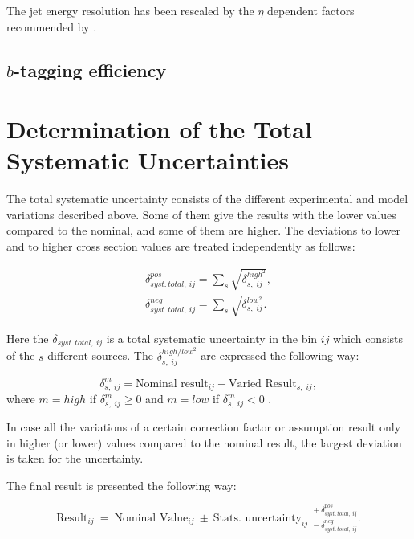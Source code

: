 The jet energy resolution has been rescaled by the $\eta$ dependent factors recommended by \cite{TWikiSystJER}.

\subsection{$b$-tagging efficiency}
\section{Determination of the Total Systematic Uncertainties}

The total systematic uncertainty consists of the different experimental and model variations described above.
Some of them give the results with the lower values compared to the nominal, and some of them are higher.
The deviations to lower and to higher cross section values are treated independently as follows:

\begin{align}
 \delta_{syst.\,total,\:ij}^{pos} = \sum_{s}\sqrt{\delta_{s,\;ij}^{high^{2}}}, \\
 \delta_{syst.\,total,\:ij}^{neg} = \sum_{s} \sqrt{\delta_{s,\;ij}^{low^{2}}}.
\end{align}

Here the $\delta_{syst.\,total,\:ij}$ is a total systematic uncertainty in the bin $ij$ which consists of the
$s$ different sources. The $\delta_{s,\;ij}^{high/low^{2}}$ are expressed the following way:

\begin{equation}
 \delta_{s,\;ij}^{m} = \textrm{Nominal result}_{ij} - \textrm{Varied Result}_{s,\;ij}, 
\end{equation}
where $m = high$ if $\delta_{s,\;ij}^{m} \geq 0$ and $m = low$ if $\delta_{s,\;ij}^{m} < 0$ . 

In case all the variations of a certain correction factor or assumption result only in higher (or lower) values 
compared to the nominal result, the largest deviation is taken for the uncertainty.

The final result is presented the following way:

\begin{equation}
 \textrm{Result}_{ij}\: = \: \textrm{Nominal Value}_{ij}\: \pm \: \textrm{Stats. uncertainty}_{ij}\:\: { }^{+\:\delta_{syst.\,total,\:ij}^{pos}}_{-\:\delta_{syst.\,total,\:ij}^{neg}}.
\end{equation}

